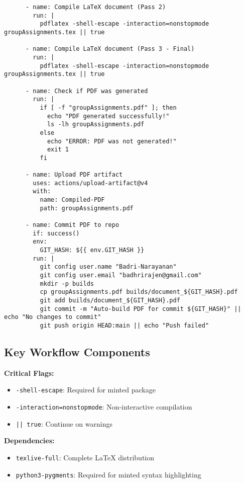 \begin{verbatim}
      - name: Compile LaTeX document (Pass 2)
        run: |
          pdflatex -shell-escape -interaction=nonstopmode groupAssignments.tex || true

      - name: Compile LaTeX document (Pass 3 - Final)
        run: |
          pdflatex -shell-escape -interaction=nonstopmode groupAssignments.tex || true

      - name: Check if PDF was generated
        run: |
          if [ -f "groupAssignments.pdf" ]; then
            echo "PDF generated successfully!"
            ls -lh groupAssignments.pdf
          else
            echo "ERROR: PDF was not generated!"
            exit 1
          fi

      - name: Upload PDF artifact
        uses: actions/upload-artifact@v4
        with:
          name: Compiled-PDF
          path: groupAssignments.pdf

      - name: Commit PDF to repo
        if: success()
        env:
          GIT_HASH: ${{ env.GIT_HASH }}
        run: |
          git config user.name "Badri-Narayanan"
          git config user.email "badhrirajen@gmail.com"
          mkdir -p builds
          cp groupAssignments.pdf builds/document_${GIT_HASH}.pdf
          git add builds/document_${GIT_HASH}.pdf
          git commit -m "Auto-build PDF for commit ${GIT_HASH}" || echo "No changes to commit"
          git push origin HEAD:main || echo "Push failed"
\end{verbatim}

\subsection{Key Workflow Components}

\textbf{Critical Flags:}
\begin{itemize}
    \item \texttt{-shell-escape}: Required for minted package
    \item \texttt{-interaction=nonstopmode}: Non-interactive compilation
    \item \texttt{|| true}: Continue on warnings
\end{itemize}

\textbf{Dependencies:}
\begin{itemize}
    \item \texttt{texlive-full}: Complete LaTeX distribution
    \item \texttt{python3-pygments}: Required for minted syntax highlighting
\end{itemize}

